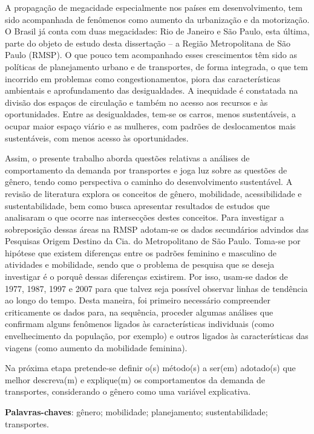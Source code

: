 \documentclass[
  12pt,        %
  openright,      %
  twoside,      %
  a4paper,      %
  english,      %
  brazil        %
]{abntex2}
\begin{document}
\setlength{\absparsep}{18pt} %
\begin{resumo}

A propagação de megacidade especialmente nos países em desenvolvimento, tem sido acompanhada de fenômenos como aumento da urbanização e da motorização. O Brasil já conta com duas megacidades: Rio de Janeiro e São Paulo, esta última, parte do objeto de estudo desta dissertação – a Região Metropolitana de São Paulo (RMSP). O que pouco tem acompanhado esses crescimentos têm sido as políticas de planejamento urbano e de transportes, de forma integrada, o que tem incorrido em problemas como congestionamentos, piora das características ambientais e aprofundamento das desigualdades. A inequidade é constatada  na divisão dos espaços de circulação e também no acesso aos recursos e às oportunidades. Entre as desigualdades, tem-se os carros, menos sustentáveis, a ocupar maior espaço viário e as mulheres, com padrões de deslocamentos mais sustentáveis, com menos acesso às oportunidades.

Assim, o presente trabalho aborda questões relativas a análises de comportamento da demanda por transportes e joga luz sobre as questões de gênero, tendo como perspectiva o caminho do desenvolvimento sustentável. A revisão de literatura explora os conceitos de gênero, mobilidade, acessibilidade e sustentabilidade, bem como busca apresentar resultados de estudos que analisaram o que ocorre nas intersecções destes conceitos. Para investigar a sobreposição dessas áreas na RMSP adotam-se os dados secundários advindos das Pesquisas Origem Destino da Cia. do Metropolitano de São Paulo. Toma-se por hipótese que existem diferenças entre os padrões feminino e masculino de atividades e mobilidade, sendo que o problema de pesquisa que se deseja investigar é o porquê dessas diferenças existirem. Por isso, usam-se dados de 1977, 1987, 1997 e 2007 para que talvez seja possível observar linhas de tendência ao longo do tempo. Desta maneira, foi primeiro necessário compreender criticamente os dados para, na sequência, proceder algumas análises que confirmam alguns fenômenos ligados às características individuais (como envelhecimento da população, por exemplo) e outros ligados às características das viagens (como aumento da mobilidade feminina).

Na próxima etapa pretende-se definir o(s) método(s) a ser(em) adotado(s) que melhor descreva(m) e explique(m) os comportamentos da demanda de transportes, considerando o gênero como uma variável explicativa.

 \textbf{Palavras-chaves}: gênero; mobilidade; planejamento; sustentabilidade; transportes.
\end{resumo}
\end{document}
